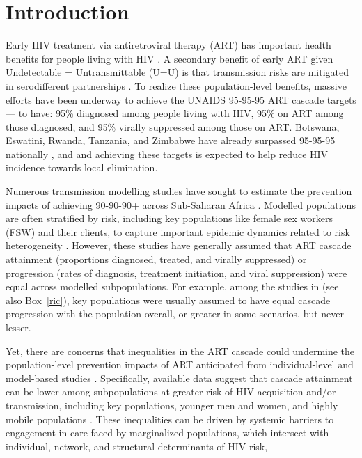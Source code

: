 \section{Introduction}\label{art.intro}
Early HIV treatment via antiretroviral therapy (ART) has
important health benefits for people living with HIV \cite{Lundgren2015init}.
A secondary benefit of early ART given Undetectable = Untransmittable (U=U) is that
transmission risks are mitigated in serodifferent partnerships \cite{Cohen2016}.
To realize these population-level benefits, massive efforts have been underway to achieve
the UNAIDS 95-95-95 ART cascade targets \cite{UNAIDS2023} --- \ie to have:
95\% diagnosed among people living with HIV,
95\% on ART among those diagnosed, and
95\% virally suppressed among those on ART.
Botswana, Eswatini, Rwanda, Tanzania, and Zimbabwe
have already surpassed 95-95-95 nationally \cite{UNAIDS2023}, and
and achieving these targets is expected to help reduce HIV incidence towards local elimination.
\par
Numerous transmission modelling studies have sought to estimate
the prevention impacts of achieving 90-90-90+ across Sub-Saharan Africa
\cite{Eaton2012sys,Knight2022sr}.
Modelled populations are often stratified by risk,
including key populations like female sex workers (FSW) and their clients,
to capture important epidemic dynamics related to risk heterogeneity \cite{Watts2010}.
However, these studies have generally assumed that ART cascade
attainment (\ie proportions diagnosed, treated, and virally suppressed) or
progression (\ie rates of diagnosis, treatment initiation, and viral suppression)
were equal across modelled subpopulations.
For example, among the studies in \cite{Knight2022sr} (see also Box~\ref{ric}),
key populations were usually assumed to have
equal cascade progression with the population overall,
or greater in some scenarios, but never lesser.
\par
Yet, there are concerns that inequalities in the ART cascade
could undermine the population-level prevention impacts of ART
anticipated from individual-level and model-based studies
\cite{Baral2019,Green2020,Maheu-Giroux2024}.
Specifically, available data suggest that cascade attainment can be lower
among subpopulations at greater risk of HIV acquisition and/or transmission,
including key populations, younger men and women, and highly mobile populations
\cite{Hakim2018,Green2020}.
These inequalities can be driven by
systemic barriers to engagement in care faced by marginalized populations,
which intersect with individual, network, and structural determinants of HIV risk,
